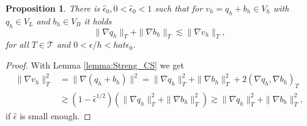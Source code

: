 \documentclass{article}
\newtheorem{propo}[thm]{Proposition}
\newcommand{\T}{\ensuremath{\mathcal{T}}\xspace}
\begin{document}
\begin{appendix}
\begin{propo}
\label{Propo:AngleSpace2}
There is $\hat{\epsilon}_0, 0 < \hat{\epsilon}_0 < 1$ such that for
${v_h = q_h + b_h}\in V_h$ with $q_h \in V_L$  and $b_h \in V_B$ it holds
\begin{equation*}
    \|\nabla q_h\|_T  + \|\nabla b_h\|_T \lesssim \|\nabla v_h\|_T ,
\end{equation*}
for all $T\in \T$ and $0<\epsilon / h <hat{\epsilon}_0$.
\end{propo}

 \begin{proof}
 With Lemma \ref{lemma:Streng_CS} we get
 \begin{align*}
 \|\nabla v_h\|_T^2 &= \| \nabla (q_h + b_h)\|^2 
 =
 \|\nabla q_h\|_T^2 +\|\nabla b_h\|_T^2 + 2 (\nabla q_h,\nabla b_h)_T
  \\
  &\gtrsim (1- \hat{\epsilon}^{1/2}) (\|\nabla q_h\|_T^2 +\|\nabla b_h\|_T^2 )
  \gtrsim \|\nabla q_h\|_T^2 +\|\nabla b_h\|_T^2,
 \end{align*}
if $\hat{\epsilon}$ is small enough.
 \end{proof}

\end{appendix}



\end{document}
